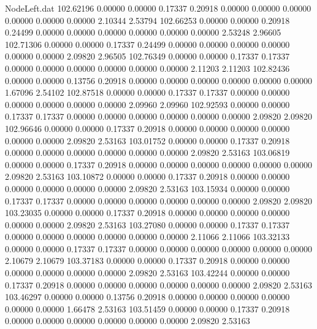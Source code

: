 \begin{filecontents}{NodeLeft.dat}
 102.62196    0.00000    0.00000     0.17337    0.20918    0.00000    0.00000    0.00000    0.00000    0.00000    0.00000    2.10344    2.53794
 102.66253    0.00000    0.00000     0.20918    0.24499    0.00000    0.00000    0.00000    0.00000    0.00000    0.00000    2.53248    2.96605
 102.71306    0.00000    0.00000     0.17337    0.24499    0.00000    0.00000    0.00000    0.00000    0.00000    0.00000    2.09820    2.96505
 102.76349    0.00000    0.00000     0.17337    0.17337    0.00000    0.00000    0.00000    0.00000    0.00000    0.00000    2.11203    2.11203
 102.82436    0.00000    0.00000     0.13756    0.20918    0.00000    0.00000    0.00000    0.00000    0.00000    0.00000    1.67096    2.54102
 102.87518    0.00000    0.00000     0.17337    0.17337    0.00000    0.00000    0.00000    0.00000    0.00000    0.00000    2.09960    2.09960
 102.92593    0.00000    0.00000     0.17337    0.17337    0.00000    0.00000    0.00000    0.00000    0.00000    0.00000    2.09820    2.09820
 102.96646    0.00000    0.00000     0.17337    0.20918    0.00000    0.00000    0.00000    0.00000    0.00000    0.00000    2.09820    2.53163
 103.01752    0.00000    0.00000     0.17337    0.20918    0.00000    0.00000    0.00000    0.00000    0.00000    0.00000    2.09820    2.53163
 103.06819    0.00000    0.00000     0.17337    0.20918    0.00000    0.00000    0.00000    0.00000    0.00000    0.00000    2.09820    2.53163
 103.10872    0.00000    0.00000     0.17337    0.20918    0.00000    0.00000    0.00000    0.00000    0.00000    0.00000    2.09820    2.53163
 103.15934    0.00000    0.00000     0.17337    0.17337    0.00000    0.00000    0.00000    0.00000    0.00000    0.00000    2.09820    2.09820
 103.23035    0.00000    0.00000     0.17337    0.20918    0.00000    0.00000    0.00000    0.00000    0.00000    0.00000    2.09820    2.53163
 103.27080    0.00000    0.00000     0.17337    0.17337    0.00000    0.00000    0.00000    0.00000    0.00000    0.00000    2.11066    2.11066
 103.32133    0.00000    0.00000     0.17337    0.17337    0.00000    0.00000    0.00000    0.00000    0.00000    0.00000    2.10679    2.10679
 103.37183    0.00000    0.00000     0.17337    0.20918    0.00000    0.00000    0.00000    0.00000    0.00000    0.00000    2.09820    2.53163
 103.42244    0.00000    0.00000     0.17337    0.20918    0.00000    0.00000    0.00000    0.00000    0.00000    0.00000    2.09820    2.53163
 103.46297    0.00000    0.00000     0.13756    0.20918    0.00000    0.00000    0.00000    0.00000    0.00000    0.00000    1.66478    2.53163
 103.51459    0.00000    0.00000     0.17337    0.20918    0.00000    0.00000    0.00000    0.00000    0.00000    0.00000    2.09820    2.53163

\end{filecontents}
